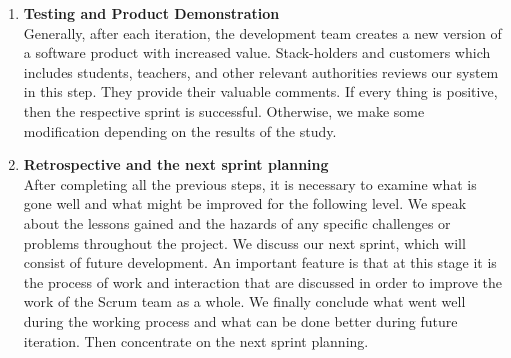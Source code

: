 \begin{enumerate}

\item \textbf{Testing and Product Demonstration}\\
Generally, after each iteration, the development team creates a new version of a software product with increased value. Stack-holders and customers which includes students, teachers, and other relevant authorities reviews our system in this step. They provide their valuable comments. If every thing is positive, then the respective sprint is successful. Otherwise, we make some modification depending on the results of the study.

\item \textbf{Retrospective and the next sprint planning}\\
After completing all the previous steps, it is necessary to examine what is gone well and what might be improved for the following level. We speak about the lessons gained and the hazards of any specific challenges or problems throughout the project. We discuss our next sprint, which will consist of future development. An important feature is that at this stage it is the process of work and interaction that are discussed in order to improve the work of the Scrum team as a whole. We finally conclude what went well during the working process and what can be done better during future iteration. Then concentrate on the next sprint planning.

\end{enumerate}


\clearpage